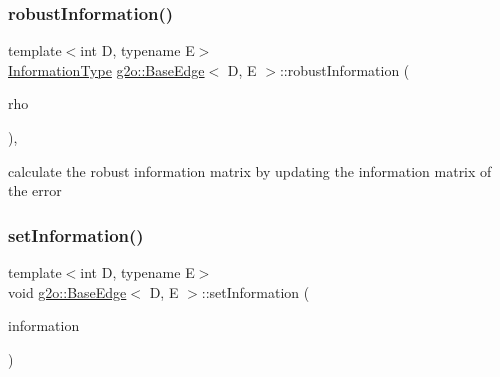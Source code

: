 \mbox{\label{classg2o_1_1_base_edge_a069937ed6fadf557368cd0fce7ab2f59}} 
\subsubsection{\texorpdfstring{robust\+Information()}{robustInformation()}}
{\footnotesize\ttfamily template$<$int D, typename E$>$ \\
\mbox{\hyperlink{classg2o_1_1_base_edge_a2e5a33343ac3f189d8a7d5ee4d8b73fc}{Information\+Type}} \mbox{\hyperlink{classg2o_1_1_base_edge}{g2o\+::\+Base\+Edge}}$<$ D, E $>$\+::robust\+Information (\begin{DoxyParamCaption}\item[{const Eigen\+::\+Vector3d \&}]{rho }\end{DoxyParamCaption})\hspace{0.3cm}{\ttfamily [inline]}, {\ttfamily [protected]}}

calculate the robust information matrix by updating the information matrix of the error \mbox{\label{classg2o_1_1_base_edge_a9bb871a94d2413ec3113a147417f2dc4}} 
\subsubsection{\texorpdfstring{set\+Information()}{setInformation()}}
{\footnotesize\ttfamily template$<$int D, typename E$>$ \\
void \mbox{\hyperlink{classg2o_1_1_base_edge}{g2o\+::\+Base\+Edge}}$<$ D, E $>$\+::set\+Information (\begin{DoxyParamCaption}\item[{const \mbox{\hyperlink{classg2o_1_1_base_edge_a2e5a33343ac3f189d8a7d5ee4d8b73fc}{Information\+Type}} \&}]{information }\end{DoxyParamCaption})\hspace{0.3cm}{\ttfamily [inline]}}

\mbox{\label{classg2o_1_1_base_edge_a24aae7b4fc35d311158f104cfdd95aeb}} 
